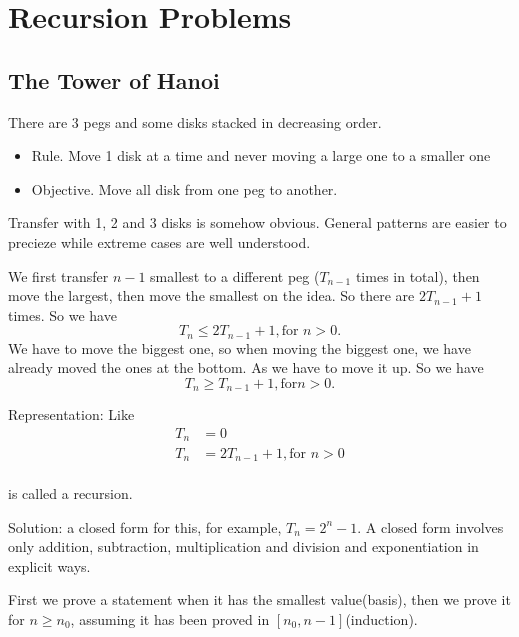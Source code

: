 \chapter{Recursion Problems}

\section{The Tower of Hanoi}

 There are 3 pegs and some disks stacked in decreasing order.

\begin{itemize}

    \item Rule. Move 1 disk at a time and never moving a large one to a smaller one
    \item Objective. Move all disk from one peg to another. 

\end{itemize}

Transfer with 1, 2 and 3 disks is somehow obvious. 
General patterns are easier to precieze while extreme cases are well
understood. 

 We first transfer $n-1$ smallest to a
different peg ($T_{n-1}$ times in total), then move the largest, then move the
smallest on the idea. So there are $2T_{n-1}+1$ times. So we have 
\[
    T_{n} \leq 2T_{n-1}+1, \text{for }n>0. 
\]
We have to move the biggest one, so when moving the biggest one, we have already moved the ones at the bottom. As we have to move it up. So we have 
\[
    T_{n} \geq  T_{n-1}+1, \text{for} n>0.
\]


Representation: Like
\begin{align*}
    T_n &= 0 \\
    T_n &= 2T_{n-1}+1 , \text{for } n>0\\
\end{align*}

is called a recursion. 

Solution: a closed form for this, for example, $T_{n}=2^{n}-1$. A closed form
involves only addition, subtraction, multiplication and division and
exponentiation in explicit ways.

First we prove a statement when it has the smallest value(basis), then we prove
it for $n\geq n_0$, assuming it has been proved in $[n_0, n-1]$(induction). 


